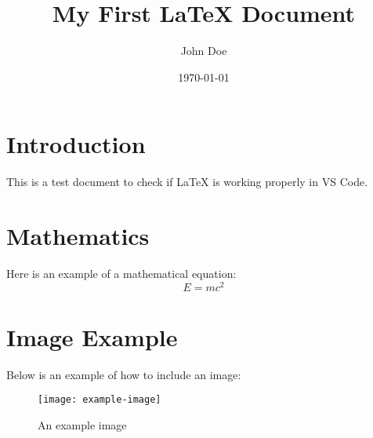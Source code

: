 \documentclass[a4paper, 12pt]{article}
\title{My First LaTeX Document}
\author{John Doe}
\date{\today}
\begin{document}
\maketitle

\section{Introduction}
This is a test document to check if LaTeX is working properly in VS Code.

\section{Mathematics}
Here is an example of a mathematical equation:
\begin{equation}
    E = mc^2
\end{equation}

\section{Image Example}
Below is an example of how to include an image:
\begin{figure}[h]
    \centering
    \texttt{[image: example-image]} %
    \caption{An example image}
    \label{fig:example}
\end{figure}
\end{document}
